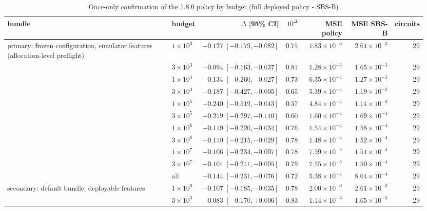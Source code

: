 \begin{table}[htbp]
\centering
\footnotesize
\setlength{\tabcolsep}{3.0pt}
\caption{Once-only confirmation of the 1.8.0 policy by budget (full deployed policy - SBS-B)}
\label{tab:qem190-primary}
\begin{adjustbox}{max width=\textwidth}\begin{tabular}{llrrrrr}
\toprule
bundle & budget & $\Delta$ [95\% CI] & $10^{\Delta}$ & MSE policy & MSE SBS-B & circuits \\
\midrule
primary: frozen configuration, simulator features (allocation-level preflight) & $1\times10^{3}$ & $-0.127\;[-0.179,-0.082]$ & $0.75$ & $1.83\times10^{-3}$ & $2.61\times10^{-3}$ & 29 \\
 & $3\times10^{3}$ & $-0.094\;[-0.163,-0.037]$ & $0.81$ & $1.28\times10^{-3}$ & $1.65\times10^{-3}$ & 29 \\
 & $1\times10^{4}$ & $-0.134\;[-0.260,-0.027]$ & $0.73$ & $6.35\times10^{-4}$ & $1.27\times10^{-3}$ & 29 \\
 & $3\times10^{4}$ & $-0.187\;[-0.427,-0.005]$ & $0.65$ & $5.39\times10^{-4}$ & $1.19\times10^{-3}$ & 29 \\
 & $1\times10^{5}$ & $-0.240\;[-0.519,-0.043]$ & $0.57$ & $4.84\times10^{-4}$ & $1.14\times10^{-3}$ & 29 \\
 & $3\times10^{5}$ & $-0.219\;[-0.297,-0.140]$ & $0.60$ & $1.60\times10^{-4}$ & $1.69\times10^{-4}$ & 29 \\
 & $1\times10^{6}$ & $-0.119\;[-0.220,-0.034]$ & $0.76$ & $1.54\times10^{-4}$ & $1.58\times10^{-4}$ & 29 \\
 & $3\times10^{6}$ & $-0.110\;[-0.215,-0.029]$ & $0.78$ & $1.48\times10^{-4}$ & $1.52\times10^{-4}$ & 29 \\
 & $1\times10^{7}$ & $-0.106\;[-0.234,-0.007]$ & $0.78$ & $7.59\times10^{-5}$ & $1.51\times10^{-4}$ & 29 \\
 & $3\times10^{7}$ & $-0.104\;[-0.241,-0.005]$ & $0.79$ & $7.55\times10^{-5}$ & $1.50\times10^{-4}$ & 29 \\
 & all & $-0.144\;[-0.231,-0.076]$ & $0.72$ & $5.38\times10^{-4}$ & $8.64\times10^{-4}$ & 29 \\
\midrule
secondary: default bundle, deployable features & $1\times10^{3}$ & $-0.107\;[-0.185,-0.035]$ & $0.78$ & $2.00\times10^{-3}$ & $2.61\times10^{-3}$ & 29 \\
 & $3\times10^{3}$ & $-0.083\;[-0.170,+0.006]$ & $0.83$ & $1.14\times10^{-3}$ & $1.65\times10^{-3}$ & 29 \\

\end{tabular}
\end{adjustbox}
\end{table}

